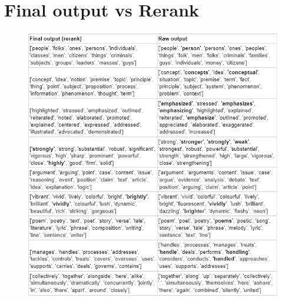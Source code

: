 \documentclass[12pt,oneside,openright,a4paper]{cpe-english-project}
\begin{document}


\makeatletter
\g@addto@macro{\UrlBreaks}{\UrlOrds}
\makeatother




\section{Final output vs Rerank}
\begin{figure}[!h]\centering
\includegraphics{./img/Appendix/FinalvsRerank.png}
\end{figure}
\end{document}

